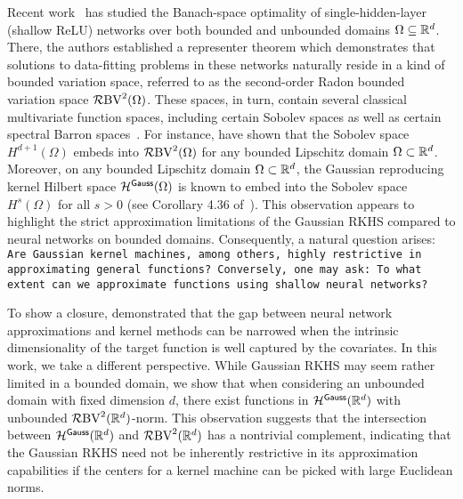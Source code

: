 Recent work~\citep{Parhi2020BanachSR,near_mini} has studied the Banach-space optimality of single-hidden-layer (shallow ReLU) networks over both bounded and unbounded domains \(\Omega \subseteq \mathbb{R}^d\).  There, the authors established a representer theorem which demonstrates that solutions to data-fitting problems in these networks naturally reside in a kind of bounded variation space, referred to as the second-order Radon bounded variation space \(\mathcal{R}\mathrm{BV}^2({\Omega})\). These spaces, in turn, contain several classical multivariate function spaces, including certain Sobolev spaces as well as certain spectral Barron spaces~\citep{barron_universal}. For instance, \citet{near_mini} have shown that the Sobolev space \(H^{d+1}(\Omega)\) embeds into \(\mathcal{R}\mathrm{BV}^2({\Omega})\) for any bounded Lipschitz domain $\Omega \subset \mathbb{R}^d$. Moreover, on any bounded Lipschitz domain \(\Omega \subset \mathbb{R}^d\), the Gaussian reproducing kernel Hilbert space \({\mathcal{H}}^{\textsf{Gauss}}(\Omega)\) is known to embed into the Sobolev space \(H^{s}(\Omega)\) for all \(s> 0\) (see Corollary 4.36 of~\citet{steinwart_svm}). This observation appears to highlight the strict approximation limitations of the Gaussian RKHS compared to neural networks on bounded domains. Consequently, a natural question arises: \tt{Are Gaussian kernel machines, among others, highly restrictive in approximating general functions}? Conversely, one may ask: \tt{To what extent can we approximate functions using shallow neural networks}?


To show a closure, \cite{ghorbani2019limitations} demonstrated that the gap between neural network approximations and kernel methods can be narrowed when the intrinsic dimensionality of the target function is well captured by the covariates. In this work, we take a different perspective. While Gaussian RKHS may seem rather limited in a bounded domain, we show that when considering an unbounded domain with fixed dimension \(d\), there exist functions in \({\mathcal{H}}^{\textsf{Gauss}}(\mathbb{R}^d)\) with unbounded $\mathcal{R}\mathrm{BV}^2({\mathbb{R}^d})$-norm. This observation suggests that the intersection between \({\mathcal{H}}^{\textsf{Gauss}}(\mathbb{R}^d)\) and \(\mathcal{R}\mathrm{BV}^2({\mathbb{R}^d})\) has a nontrivial complement, indicating that the Gaussian RKHS need not be inherently restrictive in its approximation capabilities if the centers for a kernel machine can be picked with large Euclidean norms. %

